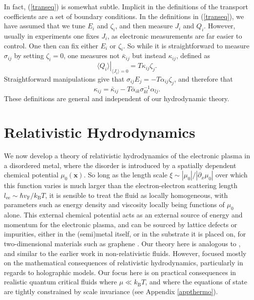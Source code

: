 \documentclass[10pt, oneside]{book}
\begin{document}
\begin{doublespace}
In fact, (\ref{transeq}) is somewhat subtle.   Implicit in the definitions of the transport coefficients are a set of boundary conditions.   In the definitions in (\ref{transeq}), we have assumed that we tune $E_i$ and $ \zeta_i$, and then measure $ J_i$ and $Q_i$.   However, usually in experiments one fixes $J_i$, as electronic measurements are far easier to control.  One then can fix either $E_i$ or $\zeta_i$. So while it is straightforward to measure $\sigma_{ij}$ by setting $\zeta_i=0$,  one measures not $\bar{\kappa}_{ij}$ but instead $\kappa_{ij}$, defined as \begin{equation}
\left.\langle  Q_i\rangle\right|_{\langle  J_i\rangle = 0} = T\kappa_{ij} \zeta_j.
\end{equation}Straightforward manipulations give that $\sigma_{ij}E_j = -T\alpha_{ij}\zeta_j$, and therefore that\begin{equation}
\kappa_{ij} = \bar\kappa_{ij} - T\bar\alpha_{ik}\sigma^{-1}_{kl}\alpha_{lj}.
\end{equation}
These definitions are general and independent of our hydrodynamic theory.




\section{Relativistic Hydrodynamics}\label{sechydro}
We now develop a theory of relativistic hydrodynamics of the electronic plasma in a disordered metal, where the disorder is introduced by a spatially dependent chemical potential $\mu_0(\mathbf{x})$.    So long as the length scale $\xi \sim |\mu_0|/ |\partial_x \mu_0|$ over which this function varies is much larger than the electron-electron scattering length $l_{\mathrm{ee}} \sim \hbar v_{\mathrm{F}} /k_{\mathrm{B}}T$, it is sensible to treat the fluid as locally homogeneous, with parameters such as energy density and viscosity locally being functions of $\mu_0$ alone.  This external chemical potential acts as an external source of energy and momentum for the electronic plasma, and can be sourced by lattice defects or impurities, either in the (semi)metal itself, or in the substrate it is placed on, for two-dimensional materials such as graphene \cite{yacoby2007, xue}.   Our theory here is  analogous to \cite{Lucas:2015lna}, and similar to the earlier work \cite{andreev2011} in non-relativistic fluids.   However, \cite{Lucas:2015lna} focused mostly on the mathematical consequences of relativistic hydrodynamics, particularly in regards to holographic models.   Our focus here is on practical consequences in realistic quantum critical fluids where $\mu \ll k_{\mathrm{B}}T$, and where the equations of state are tightly constrained by scale invariance (see Appendix \ref{appthermo}).


\end{doublespace}
\end{document}
